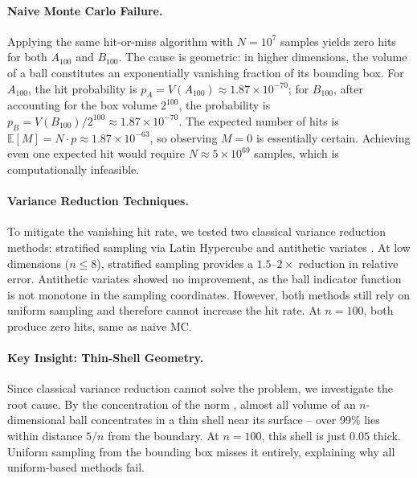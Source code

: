 \documentclass[a4paper,10pt]{article}
\theoremstyle{nonumberplain}
\theoremstyle{nonumberplain}
\theoremstyle{nonumberplain}
\theoremstyle{nonumberplain}
\begin{document}
\paragraph{Naive Monte Carlo Failure.}

Applying the same hit-or-miss algorithm with $N = 10^7$ samples yields zero hits for both $A_{100}$ and $B_{100}$. The cause is geometric: in higher dimensions, the volume of a ball constitutes an exponentially vanishing fraction of its bounding box. For $A_{100}$, the hit probability is $p_A = V(A_{100}) \approx 1.87 \times 10^{-70}$; for $B_{100}$, after accounting for the box volume $2^{100}$, the probability is $p_B = V(B_{100})/2^{100} \approx 1.87 \times 10^{-70}$. The expected number of hits is $\mathbb{E}[M] = N \cdot p \approx 1.87 \times 10^{-63}$, so observing $M = 0$ is essentially certain. Achieving even one expected hit would require $N \approx 5 \times 10^{69}$ samples, which is computationally infeasible.

\paragraph{Variance Reduction Techniques.}

To mitigate the vanishing hit rate, we tested two classical variance reduction methods: stratified sampling via Latin Hypercube \cite{mckay1979} and antithetic variates \cite{hammersley1956}. At low dimensions ($n \le 8$), stratified sampling provides a $1.5$--$2\times$ reduction in relative error. Antithetic variates showed no improvement, as the ball indicator function is not monotone in the sampling coordinates. However, both methods still rely on uniform sampling and therefore cannot increase the hit rate. At $n = 100$, both produce zero hits, same as naive MC.

\paragraph{Key Insight: Thin-Shell Geometry.}

Since classical variance reduction cannot solve the problem, we investigate the root cause. By the concentration of the norm \cite{vershynin2018}, almost all volume of an $n$-dimensional ball concentrates in a thin shell near its surface -- over 99\% lies within distance $5/n$ from the boundary. At $n = 100$, this shell is just $0.05$ thick. Uniform sampling from the bounding box misses it entirely, explaining why all uniform-based methods fail.
\end{document}
